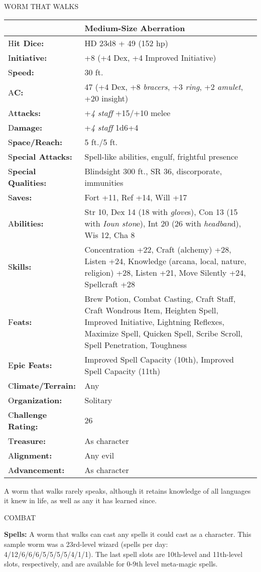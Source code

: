 \documentclass{article}
\begin{document}
{\vspace{12pt}
{\LARGE{}WORM THAT WALKS }

\begin{tabular}{|>{\raggedright}p{50pt}|>{\raggedright}p{275pt}|}
\hline
  & Medium-Size Aberration \tabularnewline
\hline
H\textbf{it Dice:} & HD 23d8 + 49 (152 hp)\tabularnewline
\hline
I\textbf{nitiative:} & +8 (+4 Dex, +4 Improved Initiative) \tabularnewline
\hline
S\textbf{peed:} & 30 ft. \tabularnewline
\hline
A\textbf{C:} & 47 (+4 Dex, +8 \textit{bracers}, +3 \textit{ring}, +2 \textit{amulet}, 
+20 insight) \tabularnewline
\hline
A\textbf{ttacks:} & +\textit{4 staff }+15/+10 melee \tabularnewline
\hline
D\textbf{amage:} & +\textit{4 staff }1d6+4\tabularnewline
\hline
S\textbf{pace/Reach:} & 5 ft./5 ft. \tabularnewline
\hline
S\textbf{pecial Attacks:} & Spell-like abilities, engulf, frightful presence \tabularnewline
\hline
S\textbf{pecial Qualities:} & Blindsight 300 ft., SR 36, discorporate, immunities\tabularnewline
\hline
S\textbf{aves:} & Fort +11, Ref +14, Will +17 \tabularnewline
\hline
A\textbf{bilities:} & Str 10, Dex 14 (18 with \textit{glove}s), Con 13 (15 with 
\textit{Ioun ston}e), Int 20 (26 with \textit{headban}d), Wis 12, Cha 8\tabularnewline
\hline
S\textbf{kills:} & Concentration +22, Craft (alchemy) +28, Listen +24, Knowledge 
(arcana, local, nature, religion) +28, Listen +21, Move Silently +24, Spellcraft 
+28\tabularnewline
\hline
F\textbf{eats:} & Brew Potion, Combat Casting, Craft Staff, Craft Wondrous Item, 
Heighten Spell, Improved Initiative, Lightning Reflexes, Maximize Spell, Quicken 
Spell, Scribe Scroll, Spell Penetration, Toughness \tabularnewline
\hline
E\textbf{pic Feats:} & Improved Spell Capacity (10th), Improved Spell Capacity 
(11th) \tabularnewline
\hline
C\textbf{limate/Terrain:} & Any \tabularnewline
\hline
O\textbf{rganization:} & Solitary \tabularnewline
\hline
C\textbf{hallenge Rating:} & 26 \tabularnewline
\hline
T\textbf{reasure:} & As character \tabularnewline
\hline
A\textbf{lignment:} & Any evil \tabularnewline
\hline
A\textbf{dvancement:} & As character \tabularnewline
\hline
\end{tabular}

A worm that walks rarely speaks, although it retains knowledge of all languages 
it knew in life, as well as any it has learned since.

COMBAT 

\textbf{Spells:} A worm that walks can cast any spells it could cast as a character. 
This sample worm was a 23rd-level wizard (spells per day: 4/12/6/6/6/5/5/5/5/4/1/1). 
The last spell slots are 10th-level and 11th-level slots, respectively, and are 
available for 0-9th level meta-magic spells. 

}
\end{document}
